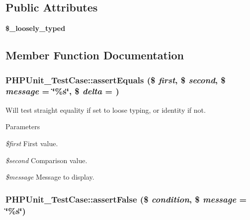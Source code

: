 \subsection*{Public Attributes}
\begin{DoxyCompactItemize}
\item 
\hypertarget{class_p_h_p_unit___test_case_a577876770bc2cd15fb929149ecf44d32}{
{\bfseries \$\_\-loosely\_\-typed}}
\label{class_p_h_p_unit___test_case_a577876770bc2cd15fb929149ecf44d32}

\end{DoxyCompactItemize}


\subsection{Member Function Documentation}
\hypertarget{class_p_h_p_unit___test_case_ae27941be41c5131649e79cb0809d742d}{
\subsubsection[{assertEquals}]{\setlength{\rightskip}{0pt plus 5cm}PHPUnit\_\-TestCase::assertEquals (\$ {\em first}, \/  \$ {\em second}, \/  \$ {\em message} = {\ttfamily \char`\"{}\%s\char`\"{}}, \/  \$ {\em delta} = {})}}
\label{class_p_h_p_unit___test_case_ae27941be41c5131649e79cb0809d742d}
Will test straight equality if set to loose typing, or identity if not. 
\begin{DoxyParams}{Parameters}
\item[{\em \$first}]First value. \item[{\em \$second}]Comparison value. \item[{\em \$message}]Message to display. \end{DoxyParams}
\hypertarget{class_p_h_p_unit___test_case_a02877e6baddfe151e45b3fbde0697a63}{
\subsubsection[{assertFalse}]{\setlength{\rightskip}{0pt plus 5cm}PHPUnit\_\-TestCase::assertFalse (\$ {\em condition}, \/  \$ {\em message} = {\ttfamily \char`\"{}\%s\char`\"{}})}}
\label{class_p_h_p_unit___test_case_a02877e6baddfe151e45b3fbde0697a63}
